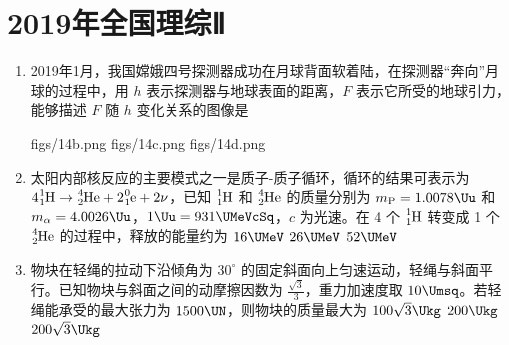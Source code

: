 \documentclass[\gkver]{gaokaozhenti}
\begin{document}
\chapter{2019年全国理综Ⅱ}

\begin{enumerate}
\item
2019年1月，我国嫦娥四号探测器成功在月球背面软着陆，在探测器“奔向”月球的过程中，用 $h$ 表示探测器与地球表面的距离，$F$ 表示它所受的地球引力，能够描述 $F$ 随 $h$ 变化关系的图像是

{figs/14b.png}
{figs/14c.png}
{figs/14d.png}


\item
太阳内部核反应的主要模式之一是质子-质子循环，循环的结果可表示为 $4\ce{^1_1H}\to\ce{^4_2He} + 2\ce{^0_1e} + 2\nu$，已知 $\ce{^1_1H}$ 和 $\ce{^4_2He}$ 的质量分别为 $m_{\mathrm{P}}=1.0078\Uu$ 和 $m_{\alpha}=4.0026\Uu$，$1\Uu=931\UMeVcSq$，$c$ 为光速。在 4 个 $\ce{^1_1H}$ 转变成 1 个 $\ce{^4_2He}$ 的过程中，释放的能量约为
\fourchoices[answer=C]
{$8\UMeV$}
{$16\UMeV$}
{$26\UMeV$}
{$52\UMeV$}

\item
物块在轻绳的拉动下沿倾角为 $30^{\circ}$ 的固定斜面向上匀速运动，轻绳与斜面平行。已知物块与斜面之间的动摩擦因数为 $\frac{\sqrt{3}}{3}$，重力加速度取 $10\Umsq$。若轻绳能承受的最大张力为 $1500\UN$，则物块的质量最大为
\fourchoices[answer=A]
{$150\Ukg$}
{$100\sqrt{3}\Ukg$}
{$200\Ukg$}
{$200\sqrt{3}\Ukg$}
\end{enumerate}
\end{document}
